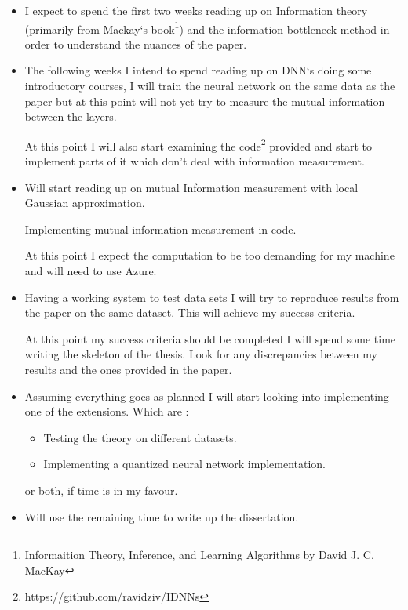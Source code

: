 \documentclass[12pt]{article}
\begin{document}



\begin{itemize}
  \item {

      I expect to spend the first two weeks reading up on Information theory
      (primarily from Mackay`s book\footnote{Informaition Theory, Inference, and
      Learning Algorithms by David J. C. MacKay}) and the information bottleneck
      method in order to understand the nuances of the paper.
  }
  \item {
      
      The following weeks I intend to spend reading up on DNN`s doing some
      introductory courses, I will train the neural network on the same data as
      the paper but at this point will not yet try to measure the mutual
      information between the layers.

      At this point I will also start examining the
      code\footnote{https://github.com/ravidziv/IDNNs} provided and start to
      implement parts of it which don't deal with information measurement.
  }
  \item {

      Will start reading up on mutual Information measurement with local
      Gaussian approximation.

      Implementing mutual information measurement in code.

      At this point I expect the computation to be too demanding for my machine
      and will need to use Azure.
  } 
  \item {

      Having a working system to test data sets I will try to reproduce results
      from the paper on the same dataset. This will achieve my success criteria.

      At this point my success criteria should be completed I will spend some
      time writing the skeleton of the thesis. Look for any discrepancies
      between my results and the ones provided in the paper.
  } \item {

      Assuming everything goes as planned I will start looking into implementing
      one of the extensions. Which are :
      \begin{itemize}
        \item Testing the theory on different datasets.
        \item Implementing a quantized neural network implementation.
      \end{itemize}
      or both, if time is in my favour.
  } \item {

      Will use the remaining time to write up the dissertation.
  }
\end{itemize}
\end{document}
